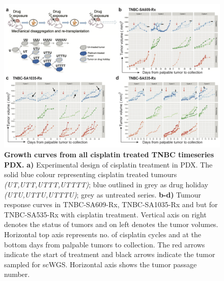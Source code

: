 

\begin{figure}
\centering
\includegraphics[width=\textwidth]{Figures/chap4/SA609allcyclescisplatin.png}
	
\caption[Representative growth curves from SA609 TNBC treated with cisplatin]
	{\small
	\textbf{Growth curves from all cisplatin treated TNBC timeseries PDX.}
	   \textbf{a)} Experimental design of cisplatin treatment in PDX. The solid blue colour representing cisplatin treated tumours \textit{(UT,UTT,UTTT,UTTTT)}; blue outlined in grey as drug holiday \textit{(UTU,UTTU,UTTTU)}; grey as untreated series.  \textbf{b-d)} Tumour response curves in TNBC-SA609-Rx, TNBC-SA1035-Rx and but for TNBC-SA535-Rx with cisplatin treatment. Vertical axis on right denotes the status of tumors and on left denotes the tumor volumes. Horizontal top axis represents no. of cisplatin cycles and at the bottom days from palpable tumors to collection. The red arrows indicate the start of treatment and black arrows indicate the tumor sampled for scWGS. Horizontal axis shows the tumor passage number. }
	
	\label{fig:SA609allcyclescisplatin}
\end{figure}



